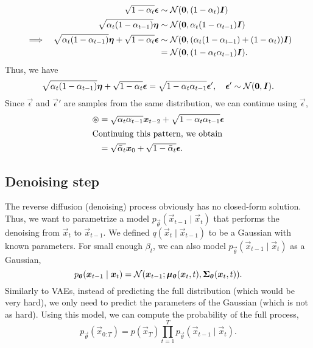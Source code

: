 \begin{align*}
     &          & \sqrt{1-\alpha_t} \vec{\epsilon}                                                 & \sim \mathcal{N}(\vec{0}, (1 - \alpha_t) \mat{I})                                \\
     &          & \sqrt{\alpha_t (1 - \alpha_{t-1})} \vec{\eta}                                    & \sim \mathcal{N}(\vec{0}, \alpha_t(1 - \alpha_{t-1}) \mat{I})                    \\
     & \implies & \sqrt{\alpha_t (1 - \alpha_{t-1})} \vec{\eta} + \sqrt{1-\alpha_t} \vec{\epsilon} & \sim \mathcal{N}(\vec{0}, (\alpha_t(1 - \alpha_{t-1}) + (1 - \alpha_t)) \mat{I}) \\
     &          &                                                                                  & = \mathcal{N}(\vec{0}, (1 - \alpha_t \alpha_{t-1}) \mat{I}).
\end{align*}
Thus, we have \[
    \sqrt{\alpha_t (1-\alpha_{t-1})} \vec{\eta} + \sqrt{1 - \alpha_t} \vec{\epsilon} = \sqrt{1 - \alpha_t\alpha_{t-1}} \vec{\epsilon}', \quad \vec{\epsilon}' \sim \mathcal{N}(\vec{0}, \mat{I}).
\]
Since $\vec{\epsilon}$ and $\vec{\epsilon}'$ are samples from the same distribution, we can
continue using $\vec{\epsilon}$,
\begin{align*}
    \circledast & = \sqrt{\alpha_t \alpha_{t-1}} \vec{x}_{t-2} + \sqrt{1 - \alpha_t\alpha_{t-1}} \vec{\epsilon} \\
    \intertext{Continuing this pattern, we obtain}
                & = \sqrt{\bar{\alpha}_t} \vec{x}_0 + \sqrt{1 - \bar{\alpha}_t} \vec{\epsilon}.
\end{align*}

\subsection{Denoising step}

The reverse diffusion (denoising) process obviously has no closed-form solution. Thus, we want to
parametrize a model $p_{\vec{\theta}}(\vec{x}_{t-1} \mid \vec{x}_t)$ that performs the denoising
from $\vec{x}_t$ to $\vec{x}_{t-1}$. We defined $q(\vec{x}_t \mid \vec{x}_{t-1})$ to be a Gaussian
with known parameters. For small enough $\beta_t$, we can also model
$p_{\vec{\theta}}(\vec{x}_{t-1} \mid \vec{x}_t)$ as a Gaussian, \[
    p_{\vec{\theta}}(\vec{x}_{t-1} \mid \vec{x}_t) = \mathcal{N}(\vec{x}_{t-1} ; \vec{\mu}_{\vec{\theta}}(\vec{x}_t, t), \mat{\Sigma}_{\vec{\theta}}(\vec{x}_t, t)).
\]
Similarly to VAEs, instead of predicting the full distribution (which would be very hard), we only
need to predict the parameters of the Gaussian (which is not as hard). Using this model, we can
compute the probability of the full process, \[
    p_{\vec{\theta}}(\vec{x}_{0:T}) = p(\vec{x}_T) \prod_{t=1}^{T} p_{\vec{\theta}}(\vec{x}_{t-1} \mid \vec{x}_t).
\]

